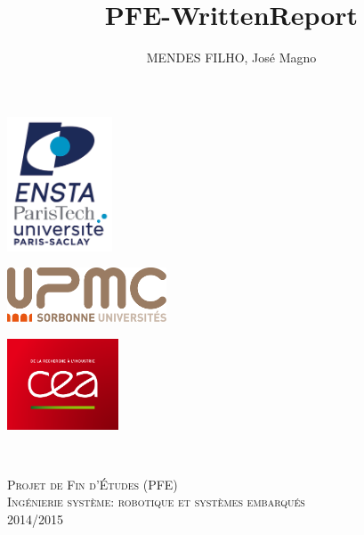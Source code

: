\documentclass[12pt]{book}
\title{PFE-WrittenReport}
\author{MENDES FILHO, José Magno}
\numberwithin{equation}{section}
\begin{document}

\begin{titlepage}

\newcommand{\HRule}{\rule{\linewidth}{0.5mm}}
\center

\begin{minipage}{0.32\textwidth}
\begin{flushleft}
	\includegraphics[height=4.0cm]{./img/logo_ensta.jpg}
\end{flushleft}
\end{minipage}
\begin{minipage}{0.32\textwidth}
\begin{center}
	\includegraphics[height=1.6cm]{./img/upmc.png}
\end{center}
\end{minipage}
\begin{minipage}{0.32\textwidth}
\begin{flushright}
	\includegraphics[height=2.7cm]{./img/cea.png}
\end{flushright}
\end{minipage}
\mbox{}\\[1.5cm]


\textsc{\LARGE Projet de Fin d'Études (PFE)}\\[0.3cm]
\textsc{\Large Ingénierie système: robotique et systèmes embarqués}\\[0.3cm]
\Large{2014/2015}\\[0.6cm]


\end{titlepage}
\end{document}
